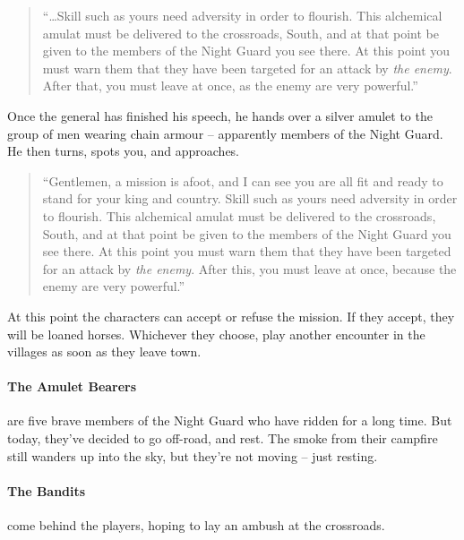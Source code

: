 \begin{boxtext}
	\begin{quotation}
	``\ldots Skill such as yours need adversity in order to flourish.  This alchemical amulat must be delivered to the crossroads, South, and at that point be given to the members of the Night Guard you see there.  At this point you must warn them that they have been targeted for an attack by \emph{the enemy}.  After that, you must leave at once, as the enemy are very powerful.''
	\end{quotation}

Once the general has finished his speech, he hands over a silver amulet to the group of men wearing chain armour -- apparently members of the Night Guard.  He then turns, spots you, and approaches.

	\begin{quotation}
	``Gentlemen, a mission is afoot, and I can see you are all fit and ready to stand for your king and country.  Skill such as yours need adversity in order to flourish.  This alchemical amulat must be delivered to the crossroads, South, and at that point be given to the members of the Night Guard you see there.  At this point you must warn them that they have been targeted for an attack by \emph{the enemy}.  After this, you must leave at once, because the enemy are very powerful.''
	\end{quotation}

\end{boxtext}

At this point the characters can accept or refuse the mission.  If they accept, they will be loaned horses.  Whichever they choose, play another encounter in the villages as soon as they leave town.

\paragraph{The Amulet Bearers} are five brave members of the Night Guard who have ridden for a long time.  But today, they've decided to go off-road, and rest.  The smoke from their campfire still wanders up into the sky, but they're not moving -- just resting.

\humansoldier

\paragraph{The Bandits} come behind the players, hoping to lay an ambush at the crossroads.

